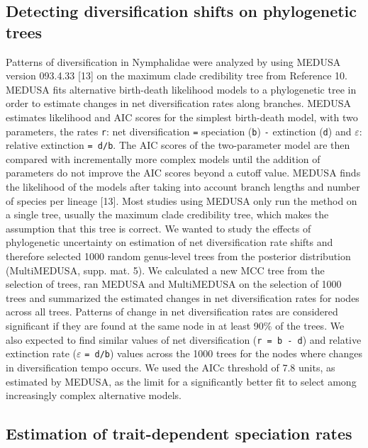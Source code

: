 \documentclass[10pt]{article}
\begin{document}
\subsection*{Detecting diversification shifts on phylogenetic
trees}

Patterns of diversification in Nymphalidae were analyzed by using MEDUSA
version 093.4.33 {[}13{]} on the maximum clade credibility tree from
Reference 10. MEDUSA fits alternative birth-death likelihood models to a
phylogenetic tree in order to estimate changes in net diversification
rates along branches. MEDUSA estimates likelihood and AIC scores for the
simplest birth-death model, with two parameters, the rates \texttt{r}:
net diversification \texttt{=} speciation (\texttt{b}) \texttt{-}
extinction (\texttt{d}) and \(\varepsilon\): relative extinction
\texttt{= d/b}. The AIC scores of the two-parameter model are then
compared with incrementally more complex models until the addition of
parameters do not improve the AIC scores beyond a cutoff value. MEDUSA
finds the likelihood of the models after taking into account branch
lengths and number of species per lineage {[}13{]}. Most studies using
MEDUSA only run the method on a single tree, usually the maximum clade
credibility tree, which makes the assumption that this tree is correct.
We wanted to study the effects of phylogenetic uncertainty on estimation
of net diversification rate shifts and therefore selected 1000 random
genus-level trees from the posterior distribution (MultiMEDUSA, supp.
mat. 5). We calculated a new MCC tree from the selection of trees, ran
MEDUSA and MultiMEDUSA on the selection of 1000 trees and summarized the
estimated changes in net diversification rates for nodes across all
trees. Patterns of change in net diversification rates are considered
significant if they are found at the same node in at least 90\% of the
trees. We also expected to find similar values of net diversification
(\texttt{r = b - d}) and relative extinction rate (\(\varepsilon\)
\texttt{= d/b}) values across the 1000 trees for the nodes where changes
in diversification tempo occurs. We used the AICc threshold of 7.8
units, as estimated by MEDUSA, as the limit for a significantly better
fit to select among increasingly complex alternative models.

\subsection*{Estimation of trait-dependent speciation
rates}
\end{document}
